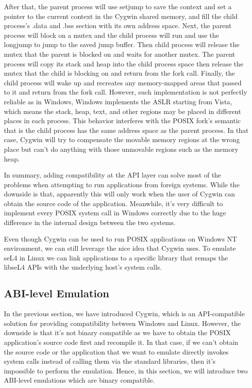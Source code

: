 After that, the parent process will use setjump to save the context and set a pointer to the current context in the Cygwin shared memory, and fill the child process's .data and .bss section with its own address space. Next, the parent process will block on a mutex and the child process will run and use the longjump to jump to the saved jump buffer. Then child process will release the mutex that the parent is blocked on and waits for another mutex. The parent process will copy its stack and heap into the child process space then release the mutex that the child is blocking on and return from the fork call. Finally, the child process will wake up and recreates any memory-mapped areas that passed to it and return from the fork call. However, such implementation is not perfectly reliable as in Windows, Windows implements the ASLR starting from Vista, which means the stack, heap, text, and other regions may be placed in different places in each process. This behavior interferes with the POSIX fork's semantic that is the child process has the same address space as the parent process. In that case, Cygwin will try to compensate the movable memory regions at the wrong place but can't do anything with those unmovable regions such as the memory heap.

In summary, adding compatibility at the API layer can solve most of the problems when attempting to run applications from foreign systems. While the downside is that, apparently this will only work when the user of Cygwin can obtain the source code of the application. Meanwhile, it's very difficult to implement every POSIX system call in Windows correctly due to the huge difference in the internal design between the two systems. 

Even though Cygwin can be used to run POSIX applications on Windows NT environment, we can still leverage the nice idea that Cygwin uses. To emulate seL4 in Linux we can link applications to a specific library that remaps the libseL4 APIs with the underlying host's system calls.

\subsection{ABI-level Emulation}

In the previous section, we have introduced Cygwin, which is an API-compatible solution for providing compatibility between Windows and Linux. However, the downside is that it's not binary compatible as we have to obtain the POSIX application's source code first and recompile it. In that case,  if we can't obtain the source code or the application that we want to emulate directly invokes system calls instead of calling them via the standard libraries, then it's impossible to perform the emulation. Hence, in this section, we will introduce two ABI-level emulations which are binary compatible.


